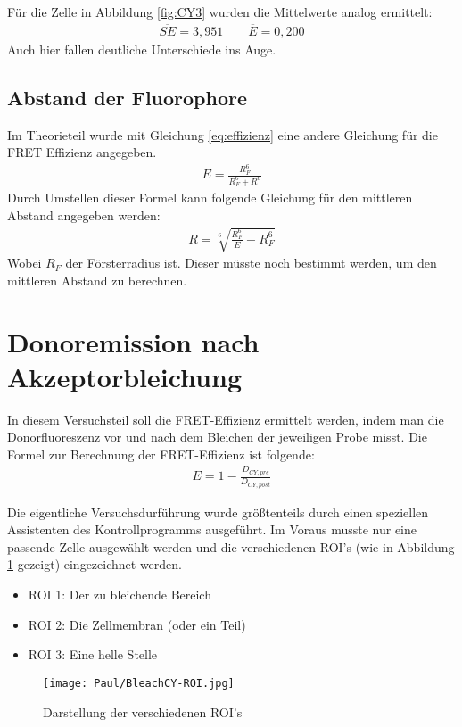 Für die Zelle in Abbildung \ref{fig:CY3} wurden die Mittelwerte analog ermittelt: 
\begin{align*}
    \overline{SE} = 3,951 \qquad \overline{E} = 0,200
\end{align*}
Auch hier fallen deutliche Unterschiede ins Auge.

\subsection{Abstand der Fluorophore}
Im Theorieteil wurde mit Gleichung \ref{eq:effizienz} eine andere Gleichung für die FRET Effizienz angegeben. 
\begin{align}
    E = \frac{R_F^6}{R_F^6+R^6}
\end{align}
Durch Umstellen dieser Formel kann folgende Gleichung für den mittleren Abstand angegeben werden: 
\begin{align}
    R = \sqrt[6]{\frac{R_F^6}{E} - R_F^6} 
\end{align}
Wobei $R_F$ der Försterradius ist. Dieser müsste noch bestimmt werden, um den mittleren Abstand zu berechnen.

\newpage
\section{Donoremission nach Akzeptorbleichung}
In diesem Versuchsteil soll die FRET-Effizienz ermittelt werden, indem man die Donorfluoreszenz vor und nach dem Bleichen der jeweiligen Probe misst. Die Formel zur Berechnung der FRET-Effizienz ist folgende: 
\begin{align}
    E = 1 - \frac{D_{CY,pre}}{D_{CY,post}}
    \label{eq:FREE}
\end{align}

Die eigentliche Versuchsdurführung wurde größtenteils durch einen speziellen Assistenten des Kontrollprogramms ausgeführt. Im Voraus musste nur eine passende Zelle ausgewählt werden und die verschiedenen ROI's (wie in Abbildung \ref{fig:ROIs} gezeigt) eingezeichnet werden.
\begin{itemize}
    \item ROI 1: Der zu bleichende Bereich
    \item ROI 2: Die Zellmembran (oder ein Teil)
    \item ROI 3: Eine helle Stelle
\end{itemize}

\begin{figure}[h]
    \centering
    \texttt{[image: Paul/BleachCY-ROI.jpg]}
    \caption{Darstellung der verschiedenen ROI's}
    \label{fig:ROIs}
\end{figure}

